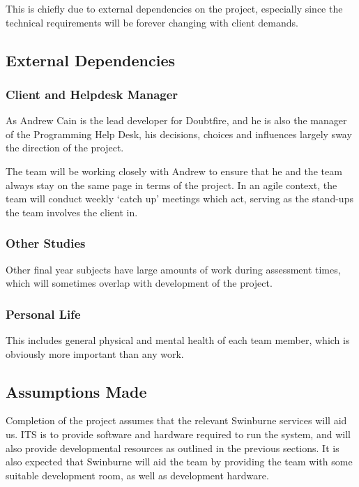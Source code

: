 \documentclass[a4paper,12pt]{article}
\begin{document}
This is chiefly due to external dependencies on the project, especially
since the technical requirements will be forever changing with client
demands.

\subsection{External Dependencies}\label{external-dependencies}

\subsubsection{Client and Helpdesk
Manager}\label{client-and-helpdesk-manager}

As Andrew Cain is the lead developer for Doubtfire, and he is also the
manager of the Programming Help Desk, his decisions, choices and
influences largely sway the direction of the project.

The team will be working closely with Andrew to ensure that he and the
team always stay on the same page in terms of the project. In an agile
context, the team will conduct weekly `catch up' meetings which act,
serving as the stand-ups the team involves the client in.

\subsubsection{Other Studies}\label{other-studies}

Other final year subjects have large amounts of work during assessment
times, which will sometimes overlap with development of the project.

\subsubsection{Personal Life}\label{personal-life}

This includes general physical and mental health of each team member,
which is obviously more important than any work.

\subsection{Assumptions Made}\label{assumptions-made}

Completion of the project assumes that the relevant Swinburne services
will aid us. ITS is to provide software and hardware required to run the
system, and will also provide developmental resources as outlined in the
previous sections. It is also expected that Swinburne will aid the team
by providing the team with some suitable development room, as well as
development hardware.
\end{document}
